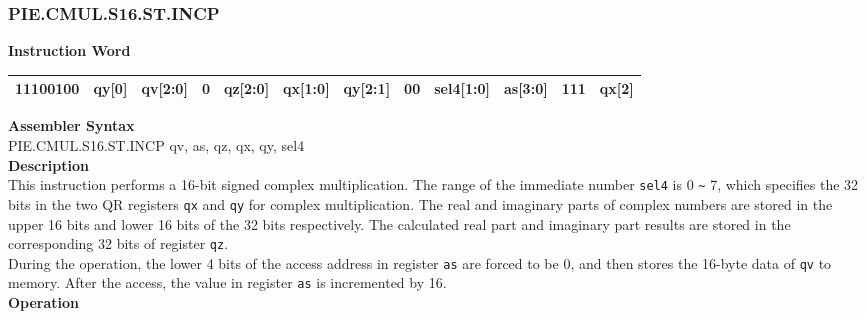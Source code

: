 \newpage
\subsubsection{PIE.CMUL.S16.ST.INCP}\label{instruction:PIECMULS16STINCP}
\setlength\tabcolsep{6pt}
\textbf{Instruction Word} \\
\begin{tabular}{|c|c|c|c|c|c|c|c|c|c|c|c|}
	\hline
	11100100 & qy[0] & qv[2:0] & 0 & qz[2:0] & qx[1:0] & qy[2:1] & 00 & sel4[1:0] & as[3:0] & 111 & qx[2] \\
	\hline
\end{tabular}

\textbf{Assembler Syntax} \\
PIE.CMUL.S16.ST.INCP qv, as, qz, qx, qy, sel4 \\
\textbf{Description} \\
This instruction performs a 16-bit signed complex multiplication. The range of the immediate number \lstinline{sel4} is 0 \verb+~+ 7, which specifies the 32 bits in the two QR registers \lstinline{qx} and \lstinline{qy} for complex multiplication. The real and imaginary parts of complex numbers are stored in the upper 16 bits and lower 16 bits of the 32 bits respectively. The calculated real part and imaginary part results are stored in the corresponding 32 bits of register \lstinline{qz}. \\ During the operation, the lower 4 bits of the access address in register \lstinline{as} are forced to be 0, and then stores the 16-byte data of \lstinline{qv} to memory. After the access, the value in register \lstinline{as} is incremented by 16.\\
\textbf{Operation}
